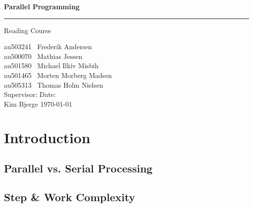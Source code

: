 \documentclass[12px,oz]{report}
\begin{document}
	
	\begin{titlepage}
		\centering
		\vspace*{3\baselineskip}
		{\Huge \bfseries Parallel Programming}
		\rule{\linewidth}{0.5mm}
		\LARGE
		Reading Course
		\\
		\null\vfill
		\begin{flushleft} \large
			au503241 \hspace*{2em} \  Frederik Andersen\\
			au500070 \hspace*{2em} \  Mathias Jessen\\
			au501580 \hspace*{2em} \  Michael Ilkiv Misbih\\
			au501465 \hspace*{2em} \  Morten Morberg Madsen\\
			au505313 \hspace*{2em} \  Thomas Holm Nielsen\\
			\vspace{100pt}
			Supervisor:\hspace{94pt}  Date: \\
			Kim Bjerge \hspace{90pt}  \today\\
		\end{flushleft}
		\vspace*{6\baselineskip}
	\end{titlepage}

\tableofcontents
\clearpage
{}
\cleardoublepage

\chapter{Introduction}
\label{ch-intro}


	\section{Parallel vs. Serial Processing}
	\label{sec-par-vs-ser}
	

	\section{Step \& Work Complexity}
	\label{sec-step-comp}
	
\end{document}
